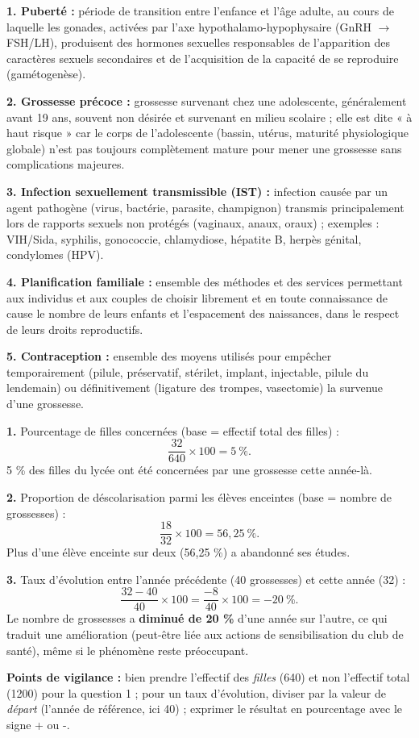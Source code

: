 \documentclass[11pt]{article}
\begin{document}
\begin{corrige}

\textbf{1. Puberté :} période de transition entre l'enfance et l'âge adulte, au cours de laquelle les gonades, activées par l'axe hypothalamo-hypophysaire (GnRH $\to$ FSH/LH), produisent des hormones sexuelles responsables de l'apparition des caractères sexuels secondaires et de l'acquisition de la capacité de se reproduire (gamétogenèse).

\textbf{2. Grossesse précoce :} grossesse survenant chez une adolescente, généralement avant 19 ans, souvent non désirée et survenant en milieu scolaire ; elle est dite « à haut risque » car le corps de l'adolescente (bassin, utérus, maturité physiologique globale) n'est pas toujours complètement mature pour mener une grossesse sans complications majeures.

\textbf{3. Infection sexuellement transmissible (IST) :} infection causée par un agent pathogène (virus, bactérie, parasite, champignon) transmis principalement lors de rapports sexuels non protégés (vaginaux, anaux, oraux) ; exemples : VIH/Sida, syphilis, gonococcie, chlamydiose, hépatite B, herpès génital, condylomes (HPV).

\textbf{4. Planification familiale :} ensemble des méthodes et des services permettant aux individus et aux couples de choisir librement et en toute connaissance de cause le nombre de leurs enfants et l'espacement des naissances, dans le respect de leurs droits reproductifs.

\textbf{5. Contraception :} ensemble des moyens utilisés pour empêcher temporairement (pilule, préservatif, stérilet, implant, injectable, pilule du lendemain) ou définitivement (ligature des trompes, vasectomie) la survenue d'une grossesse.
\end{corrige}

\begin{corrige}

\textbf{1.} Pourcentage de filles concernées (base = effectif total des filles) :
\[
\frac{32}{640}\times 100 = 5\ \%.
\]
5 \% des filles du lycée ont été concernées par une grossesse cette année-là.

\textbf{2.} Proportion de déscolarisation parmi les élèves enceintes (base = nombre de grossesses) :
\[
\frac{18}{32}\times 100 = 56{,}25\ \%.
\]
Plus d'une élève enceinte sur deux (56,25 \%) a abandonné ses études.

\textbf{3.} Taux d'évolution entre l'année précédente (40 grossesses) et cette année (32) :
\[
\frac{32-40}{40}\times 100 = \frac{-8}{40}\times 100 = -20\ \%.
\]
Le nombre de grossesses a \textbf{diminué de 20 \%} d'une année sur l'autre, ce qui traduit une amélioration (peut-être liée aux actions de sensibilisation du club de santé), même si le phénomène reste préoccupant.

\textbf{Points de vigilance :} bien prendre l'effectif des \emph{filles} (640) et non l'effectif total (1200) pour la question 1 ; pour un taux d'évolution, diviser par la valeur de \emph{départ} (l'année de référence, ici 40) ; exprimer le résultat en pourcentage avec le signe + ou -.
\end{corrige}
\end{document}
